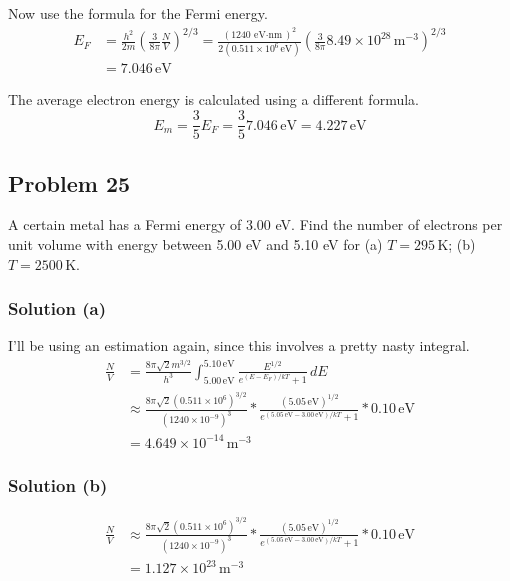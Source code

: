 \documentclass[12pt]{article}
\newcommand{\e}[1]{e^{#1}}
\newcommand{\E}[1]{\times 10^{#1}}
\begin{document}
            Now use the formula for the Fermi energy.
            \begin{align}
                E_F &=  \frac{h^2}{2m} \left( \frac{3}{8\pi} \frac{N}{V} \right)^{2/3}
                    =   \frac{(1240\,\unit{\eV\cdot\nano\meter})^2}{2(0.511\E{6}\,\unit{\eV})} \left( \frac{3}{8\pi} 8.49\E{28}\,\unit{\meter^{-3}} \right)^{2/3}\\
                    &=  \boxed{7.046\,\unit{\eV}}
            \end{align}

            The average electron energy is calculated using a different formula.
            \begin{equation}
                E_m =   \frac{3}{5} E_F
                    =   \frac{3}{5} 7.046\,\unit{\eV}
                    =   \boxed{4.227\,\unit{\eV}}
            \end{equation}
        
    \pagebreak
    \subsection{Problem 25}
            A certain metal has a Fermi energy of 3.00 eV. 
            Find the number of electrons per unit volume with energy between 5.00 eV and 5.10 eV for (a) $T = 295\,\unit{\kelvin}$; (b) $T = 2500\,\unit{\kelvin}$.

            \subsubsection{Solution (a)}
                I'll be using an estimation again, since this involves a pretty nasty integral.
                \begin{align}
                    \frac{N}{V} &=  \frac{8\pi\sqrt{2}m^{3/2}}{h^3} \int_{5.00\,\unit{\eV}}^{5.10\,\unit{\eV}} \frac{E^{1/2}}{\e{(E - E_F)/kT} + 1}\,dE\\
                        &\approx    \frac{8\pi\sqrt{2}(0.511\E{6})^{3/2}}{(1240\E{-9})^3} * \frac{(5.05\,\unit{\eV})^{1/2}}{\e{(5.05\,\unit{\eV} - 3.00\,\unit{\eV})/kT} + 1} * 0.10\,\unit{\eV}\\
                        &=  \boxed{4.649\E{-14}\,\unit{\meter^{-3}}}
                \end{align}

            \subsubsection{Solution (b)}
                \begin{align}
                    \frac{N}{V} &\approx    \frac{8\pi\sqrt{2}(0.511\E{6})^{3/2}}{(1240\E{-9})^3} * \frac{(5.05\,\unit{\eV})^{1/2}}{\e{(5.05\,\unit{\eV} - 3.00\,\unit{\eV})/kT} + 1} * 0.10\,\unit{\eV}\\
                        &=  \boxed{1.127\E{23}\,\unit{\meter^{-3}}}
                \end{align}
\end{document}
